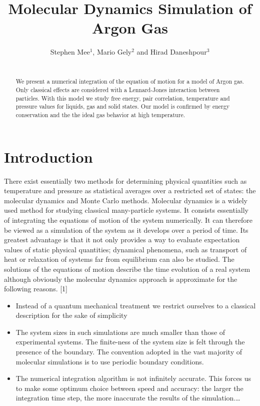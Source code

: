 \documentclass[10pt,letterpaper]{article}
\begin{document}
\title{Molecular Dynamics Simulation of Argon Gas}

\author{Stephen Mee$^1$, Mario Gely$^2$ and Hirad Daneshpour$^3$}

\address{$^1$Michigan State University (U.S.A.)\\
$^{2,3}$Delft University of Technology (Netherlands)}

\begin{abstract}
\\We present a numerical integration of the equation of motion for a model of Argon gas. Only classical effects are considered with a Lennard-Jones interaction between particles. With this model we study free energy, pair correlation, temperature and pressure values for liquids, gas and solid states. Our model is confirmed by energy conservation and the the ideal gas behavior at high temperature.
\end{abstract}


\section{Introduction}

There exist essentially two methods for determining physical quantities such as temperature and pressure as statistical averages over a restricted set of states: the molecular dynamics and Monte Carlo methods. Molecular dynamics is a widely used method for studying classical many-particle systems. It consists essentially of integrating the equations of motion of the system numerically. It can therefore be viewed as a simulation of the system as it develops
over a period of time. Its greatest advantage is that it not only provides a way to evaluate expectation values of static physical quantities; dynamical phenomena, such as transport of heat or relaxation of systems far from equilibrium can also be studied.  The solutions of the equations of motion describe the time evolution of a real system although obviously the molecular dynamics approach is approximate for
the following reasons. [1]

\begin{itemize}
  \item Instead of a quantum mechanical treatment we restrict ourselves to a classical description for the sake of simplicity
  \item The system sizes in such simulations are much smaller than those of experimental systems. The finite-ness of the system size is felt through the presence of the boundary. The convention adopted in the vast majority of molecular simulations is to use periodic boundary conditions.
  \item The numerical integration algorithm is not infinitely accurate. This forces us to make some optimum choice between speed and accuracy: the larger the integration time step, the more inaccurate the results of the simulation.\ldots
\end{itemize}
\end{document}
